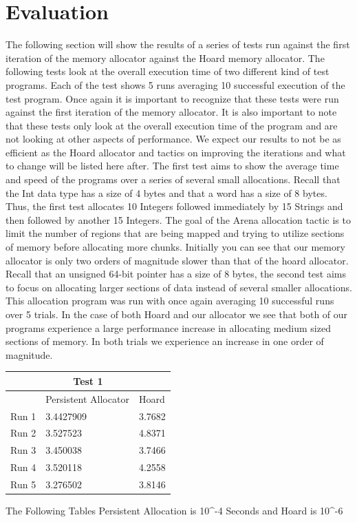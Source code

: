 \documentclass[conference]{IEEEtran}
\begin{document}
\section{Evaluation}
The following section will show the results of a series of tests run against the first iteration of the memory allocator against the Hoard memory allocator. The following tests look at the overall execution time of two different kind of test programs. Each of the test shows 5 runs averaging 10 successful execution of the test program. Once again it is important to recognize that these tests were run against the first iteration of the memory allocator. It is also important to note that these tests only look at the overall execution time of the program and are not looking at other aspects of performance. We expect our results to not be as efficient as the Hoard allocator and tactics on improving the iterations and what to change will be listed here after. The first test aims to show the average time and speed of the programs over a series of several small allocations. Recall that the Int data type has a size of 4 bytes and that a word has a size of 8 bytes. Thus, the first test allocates 10 Integers followed immediately by 15 Strings and then followed by another 15 Integers. The goal of the Arena allocation tactic is to limit the number of regions that are being mapped and trying to utilize sections of memory before allocating more chunks. Initially you can see that our memory allocator is only two orders of magnitude slower than that of the hoard allocator. Recall that an unsigned 64-bit pointer has a size of 8 bytes, the second test aims to focus on allocating larger sections of data instead of several smaller allocations. This allocation program was run with once again averaging 10 successful runs over 5 trials. In the case of both Hoard and our allocator we see that both of our programs experience a large performance increase in allocating medium sized sections of memory. In both trials we experience an increase in one order of magnitude.  



\begin{tabular}{ |p{1cm}||p{3cm}|p{3cm}|  }
 \hline
 \multicolumn{3}{|c|}{Test 1} \\
 \hline
 & Persistent Allocator & Hoard \\
 \hline
 Run 1   &3.4427909    &3.7682\\
 Run 2&   3.527523  & 4.8371   \\
 Run 3 &3.450038 & 3.7466  \\
 Run 4& 3.520118& 4.2558\\
 Run 5&   3.276502  &3.8146\\
 \hline
\end{tabular}
 The Following Tables Persistent Allocation is 10^-4 Seconds and Hoard is 10^-6
\end{document}
